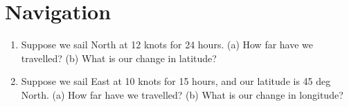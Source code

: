 \documentclass{article}
\begin{document}
\section{Navigation}

\begin{enumerate}
\item Suppose we sail North at 12 knots for 24 hours.  (a) How far have we travelled? (b) What is our change in latitude? \\ \vspace{4cm}
\item Suppose we sail East at 10 knots for 15 hours, and our latitude is 45 deg North. (a) How far have we travelled? (b) What is our change in longitude? \\ \vspace{4cm}
\end{enumerate}
\end{document}
